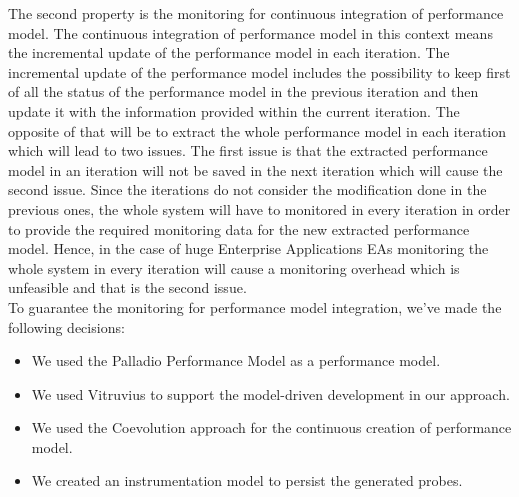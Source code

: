 The second property is the monitoring for continuous integration of performance model. The continuous integration of performance model in this context means the incremental update of the performance model in each iteration. The incremental update of the performance model includes the possibility to keep first of all the status of the performance model in the previous iteration and then update it with the information provided within the current iteration. The opposite of that will be to extract the whole performance model in each iteration which will lead to two issues. The first issue is that the extracted performance model in an iteration will not be saved in the next iteration which will cause the second issue. Since the iterations do not consider the modification done in the previous ones, the whole system will have to monitored in every iteration in order to provide the required monitoring data for the new extracted performance model. Hence, in the case of huge Enterprise Applications EAs monitoring the whole system in every iteration will cause a monitoring overhead which is unfeasible and that is the second issue. \\

To guarantee the monitoring for performance model integration, we’ve made the following decisions: 
\begin{itemize}
\item We used the Palladio Performance Model as a performance model.  
\item We used Vitruvius to support the model-driven development in our approach.
\item We used the Coevolution approach for the continuous creation of performance model. 
\item We created an instrumentation model to persist the generated probes.
\end{itemize}

